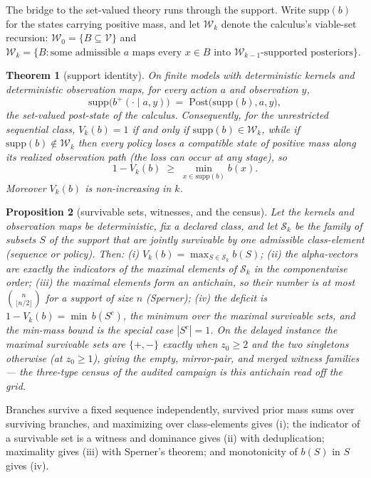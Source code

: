 \documentclass[10pt,twocolumn]{article}
\theoremstyle{plain}
\newtheorem{theorem}{Theorem}
\newtheorem{proposition}[theorem]{Proposition}
\theoremstyle{definition}
\theoremstyle{remark}
\begin{document}
The bridge to the set-valued theory runs through the support. Write
\(\mathrm{supp}(b)\) for the states carrying positive mass, and let
\(\mathcal{W}_{k}\) denote the calculus's viable-set recursion:
\(\mathcal{W}_{0} = \{B \subseteq \mathcal{V}\}\) and
\(\mathcal{W}_{k} = \{B : \text{some admissible } a \text{ maps every }
x \in B \text{ into } \mathcal{W}_{k-1}\text{-supported posteriors}\}\).

\begin{theorem}[support identity]\label{thm:support}
On finite models with deterministic kernels and deterministic
observation maps, for every action \(a\) and
observation \(y\),
\[
\mathrm{supp}\bigl(b^{+}(\cdot \mid a, y)\bigr)
\;=\; \mathrm{Post}\bigl(\mathrm{supp}(b), a, y\bigr),
\]
the set-valued post-state of the calculus. Consequently, for the
unrestricted sequential class,
\(V_{k}(b) = 1\) if and only if
\(\mathrm{supp}(b) \in \mathcal{W}_{k}\), while if
\(\mathrm{supp}(b) \notin \mathcal{W}_{k}\) then every policy loses a
compatible state of positive mass along its realized observation path
(the loss can occur at any stage), so
\[
1 - V_{k}(b) \;\ge\; \min_{x \in \mathrm{supp}(b)} b(x).
\]
Moreover \(V_{k}(b)\) is non-increasing in \(k\).
\end{theorem}

\begin{proposition}[survivable sets, witnesses, and the census]\label{prop:antichain}
Let the kernels and observation maps be deterministic, fix a declared
class, and let \(\mathcal{S}_{k}\) be the family of subsets
\(S\) of the support that are jointly survivable by one admissible
class-element (sequence or policy). Then:
(i) \(V_{k}(b) = \max_{S \in \mathcal{S}_{k}} b(S)\);
(ii) the alpha-vectors are exactly the indicators of the maximal elements
of \(\mathcal{S}_{k}\) in the componentwise order;
(iii) the maximal elements form an antichain, so their number is at
most \(\binom{n}{\lfloor n/2 \rfloor}\) for a support of size
\(n\) (Sperner);
(iv) the deficit is \(1 - V_{k}(b) = \min \, b(S^{c})\), the minimum
over the maximal survivable sets, and the min-mass bound is the special
case \(|S^{c}| = 1\).
On the delayed instance the maximal survivable sets are
\(\{+, -\}\) exactly when \(z_{0} \ge 2\) and the two singletons
otherwise (at \(z_{0} \ge 1\)), giving the empty, mirror-pair, and
merged witness families --- the three-type census of the audited campaign
is this antichain read off the grid.
\end{proposition}

Branches survive a fixed sequence independently, survived prior mass sums
over surviving branches, and maximizing over class-elements gives (i);
the indicator of a survivable set is a witness and dominance gives (ii)
with deduplication; maximality gives (iii) with Sperner's theorem; and
monotonicity of \(b(S)\) in \(S\) gives (iv).
\end{document}
